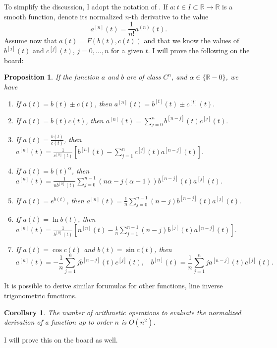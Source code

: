 \documentclass[11pt]{article}
\def\RR{\mathbb{R} }
\def\f{\frac }
\newtheorem{proposition}[theorem]{Proposition}
\newtheorem{corollary}[theorem]{Corollary}
\newenvironment{remark}[1][Remark]{\begin{trivlist}
\item[\hskip \labelsep {\bfseries #1}]}{\end{trivlist}}
\begin{document}
To simplify the discussion, I adopt the notation of \cite{jorba2005software}.
If $a : t \in I \subset \RR \to \RR$ is a smooth function, denote its normalized $n$-th derivative to the value
\[ a^{[n]} (t) = \f{1}{n!} a ^{(n)} (t) .\]
Assume now that $a(t) = F(b(t),c(t))$ and that we know the values of $b^{[j]} (t)$ and $c^{[j]} (t)$, $j= 0,\ldots, n$ for a given $t$.
I will prove the following on the board:
\begin{proposition} If the function $a$ and $b$ are of class $C^n$, and $\alpha \in \{ \RR - 0 \}$, we have
\begin{enumerate}
\item If $a(t) = b(t) \pm c(t) $, then $a^{[n]}(t) = b^{[t]}(t) \pm c^{[t]}(t).$
\item If $a(t) = b(t) c(t) $, then $a^{[n]}(t) = \sum _{j=0} ^n b^{[n-j]}(t) c^{[j]}(t).$
\item If $a(t) = \f{b(t)}{ c(t)} $, then $a^{[n]}(t) =  \f{1}{ c^{[0]}(t)} \left [ b^{[n]}(t) - \sum _{j=1} ^n c^{[j]}(t) a^{[n-j]}(t) \right ].$
\item If $a(t) = b(t)^{\alpha } $, then $a^{[n]}(t) =  \f{1}{ nb^{[0]}(t)} \sum _{j=0} ^{n-1} \left ( n \alpha - j(\alpha +1 ) \right ) b^{[n-j]}(t) a^{[j]}(t).$
\item If $a(t) = e^{b(t)}$, then $a^{[n]}(t) =  \f{1}{ n} \sum _{j=0} ^{n-1} \left ( n - j \right ) b^{[n-j]}(t) a^{[j]}(t).$
\item If $a(t) = \ln b(t)$, then $a^{[n]}(t) =  \f{1}{ b^{[0]}(t)} \left [ n^{[n]} (t) - \f{1}{n} \sum _{j=1} ^{n-1} \left ( n - j \right ) b^{[j]}(t) a^{[n-j]}(t) \right ].$
\item If $a(t) = \cos c(t)$ and $b(t) = \sin c(t)$, then 
\[a^{[n]}(t) =  -\f{1}{ n} \sum _{j=1} ^{n} j b^{[n-j]}(t) c^{[j]}(t),~~~~b^{[n]}(t) =  \f{1}{ n} \sum _{j=1} ^{n} j a^{[n-j]}(t) c^{[j]}(t) .\]
\end{enumerate}
\label{pr:mainprop}
\end{proposition}

\begin{remark} It is possible to derive similar forumulas for other functions, line inverse trigonometric functions.
\end{remark}

\begin{corollary} The number of arithmetic operations to evaluate the normalized derivation of a function up to order $n$ is $O(n^2)$.
\end{corollary}

I will prove this on the board as well.
\end{document}
